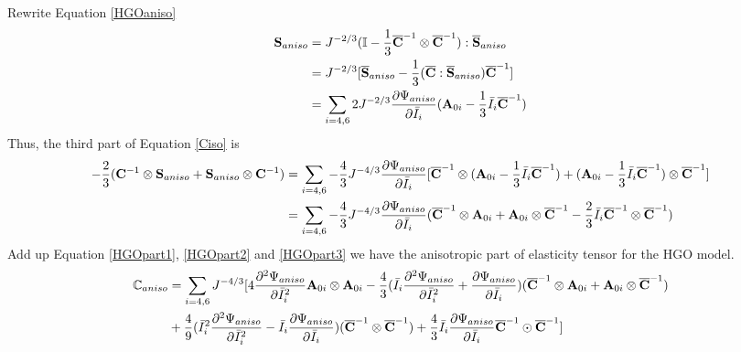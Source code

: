 Rewrite Equation \ref{HGOaniso}
\begin{equation} \label{HGOaniso2}
\begin{split}
\bold{S}_{aniso} &= J^{-2/3}(\mathbb{I} - \frac{1}{3}\overline{\bold{C}}^{-1} \otimes \overline{\bold{C}}^{-1}) : \overline{\bold{S}}_{aniso} \\
&= J^{-2/3}[\overline{\bold{S}}_{aniso} - \frac{1}{3}(\overline{\bold{C}} : \overline{\bold{S}}_{aniso})\overline{\bold{C}}^{-1}] \\
&= \sum_{i = 4, 6}2J^{-2/3}\frac{\partial\Psi_{aniso}}{\partial\bar{I}_i}(\bold{A}_{0i} - \frac{1}{3}\bar{I}_i \overline{\bold{C}}^{-1})
\end{split}
\end{equation}
Thus, the third part of Equation \ref{Ciso} is
\begin{equation} \label{HGOpart3}
\begin{split}
-\frac{2}{3}(\bold{C}^{-1} \otimes \bold{S}_{aniso} + \bold{S}_{aniso} \otimes \bold{C}^{-1}) &=
\sum_{i = 4, 6} -\frac{4}{3}J^{-4/3}\frac{\partial\Psi_{aniso}}{\partial\bar{I}_i}
[\overline{\bold{C}}^{-1} \otimes (\bold{A}_{0i} - \frac{1}{3}\bar{I}_i \overline{\bold{C}}^{-1})
+ (\bold{A}_{0i} - \frac{1}{3}\bar{I}_i \overline{\bold{C}}^{-1}) \otimes \overline{\bold{C}}^{-1}] \\
&= \sum_{i = 4, 6} -\frac{4}{3}J^{-4/3}\frac{\partial\Psi_{aniso}}{\partial\bar{I}_i}
(\overline{\bold{C}}^{-1} \otimes \bold{A}_{0i} + \bold{A}_{0i} \otimes \overline{\bold{C}}^{-1} 
- \frac{2}{3} \bar{I}_i \overline{\bold{C}}^{-1} \otimes \overline{\bold{C}}^{-1}) \\
\end{split}
\end{equation}
Add up Equation \ref{HGOpart1}, \ref{HGOpart2} and \ref{HGOpart3} we have the anisotropic part of  elasticity tensor for the HGO model.
\begin{equation} \label{HGOelasticity1}
\begin{split}
\mathbb{C}_{aniso} &= 
\sum_{i = 4, 6} J^{-4/3}[4\frac{\partial^2\Psi_{aniso}}{\partial{\bar{I}_i}^2} \bold{A}_{0i} \otimes \bold{A}_{0i} - \frac{4}{3}(\bar{I}_i\frac{\partial^2\Psi_{aniso}}{\partial{\bar{I}_i}^2} + \frac{\partial\Psi_{aniso}}{\partial{\bar{I}_i}})(\overline{\bold{C}}^{-1} \otimes \bold{A}_{0i} + \bold{A}_{0i} \otimes \overline{\bold{C}}^{-1}) \\
&+ \frac{4}{9}({\bar{I}_i}^2\frac{\partial^2\Psi_{aniso}}{\partial{\bar{I}_i}^2} - \bar{I}_i\frac{\partial\Psi_{aniso}}{\partial{\bar{I}_i}})(\overline{\bold{C}}^{-1} \otimes \overline{\bold{C}}^{-1}) 
+ \frac{4}{3}\bar{I}_i \frac{\partial\Psi_{aniso}}{\partial{\bar{I}_i}} \overline{\bold{C}}^{-1} \odot \overline{\bold{C}}^{-1}]
\end{split}
\end{equation}
